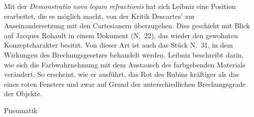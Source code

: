 Mit der \textit{Demonstratio nova legum refractionis} hat sich Leibniz eine Position erarbeitet, die es m\"{o}glich macht, von der Kritik Descartes' zur Auseinanderset\-zung mit den Cartesianern \"{u}berzugehen. Dies geschieht mit Blick auf Jacques Rohault in einem Dokument (N.~22), das wieder den gewohnten Konzeptcharak\-ter besitzt. Von dieser Art ist auch das St\"{u}ck N.~31, in dem Wirkungen des Brechungs\-gesetzes behandelt werden. Leibniz beschreibt darin, wie sich die Farb\-wahrnehmung mit dem Austausch des farbgebenden Materials ver\"{a}ndert. So erscheint, wie er ausf\"{u}hrt, das Rot des Rubins kr\"{a}ftiger als das eines roten Fensters und zwar auf Grund der unterschiedlichen Brechungsgrade der Objekte.\par\vspace{2.0ex}

Pneumatik\par\vspace{1.0ex}

